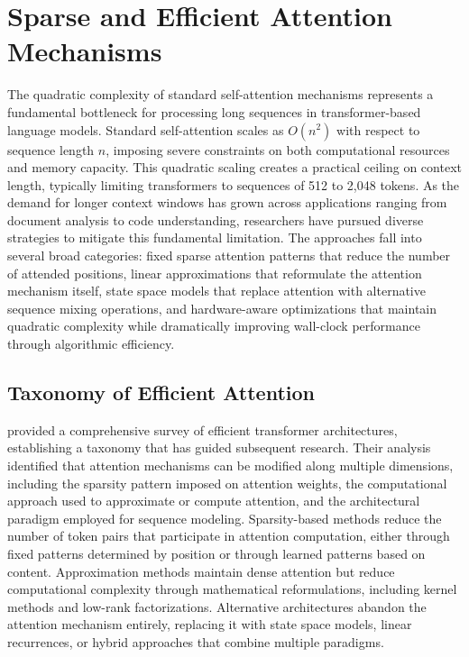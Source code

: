 \section{Sparse and Efficient Attention Mechanisms}
\label{sec:sparse}

The quadratic complexity of standard self-attention mechanisms represents a fundamental bottleneck for processing long sequences in transformer-based language models. Standard self-attention scales as $O(n^2)$ with respect to sequence length $n$, imposing severe constraints on both computational resources and memory capacity. This quadratic scaling creates a practical ceiling on context length, typically limiting transformers to sequences of 512 to 2,048 tokens. As the demand for longer context windows has grown across applications ranging from document analysis to code understanding, researchers have pursued diverse strategies to mitigate this fundamental limitation. The approaches fall into several broad categories: fixed sparse attention patterns that reduce the number of attended positions, linear approximations that reformulate the attention mechanism itself, state space models that replace attention with alternative sequence mixing operations, and hardware-aware optimizations that maintain quadratic complexity while dramatically improving wall-clock performance through algorithmic efficiency.

\subsection{Taxonomy of Efficient Attention}

\citet{tay2020efficient} provided a comprehensive survey of efficient transformer architectures, establishing a taxonomy that has guided subsequent research. Their analysis identified that attention mechanisms can be modified along multiple dimensions, including the sparsity pattern imposed on attention weights, the computational approach used to approximate or compute attention, and the architectural paradigm employed for sequence modeling. Sparsity-based methods reduce the number of token pairs that participate in attention computation, either through fixed patterns determined by position or through learned patterns based on content. Approximation methods maintain dense attention but reduce computational complexity through mathematical reformulations, including kernel methods and low-rank factorizations. Alternative architectures abandon the attention mechanism entirely, replacing it with state space models, linear recurrences, or hybrid approaches that combine multiple paradigms.

